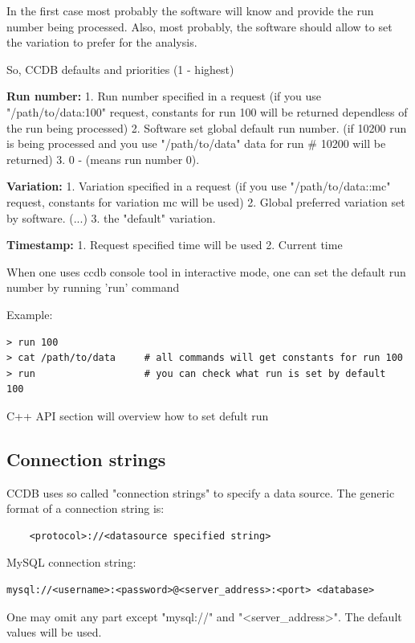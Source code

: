 \documentclass{article}
\begin{document}
In the first case most probably the software will know and provide the run 
number being processed. Also, most probably, the software should allow to set 
the variation to prefer for the analysis.

So, CCDB defaults and priorities (1 - highest)

\textbf{Run number:}
1. Run number specified in a request
(if you use "/path/to/data:100" request, constants for run 100 will be returned 
dependless of the run being processed)
2. Software set global default run number.
(if 10200 run is being processed and you use "/path/to/data" data for run \# 10200 will be returned)
3. 0 - (means run number 0).

\textbf{Variation:}
1. Variation specified in a request
(if you use "/path/to/data::mc" request, constants for variation mc will be used)
2. Global preferred variation set by software.
(...)
3. the "default" variation.


\textbf{Timestamp:}
1. Request specified time will be used
2. Current time

When one uses ccdb console tool in interactive mode, one can set the default run number by running 'run' command

Example:
\begin{verbatim}
> run 100
> cat /path/to/data     # all commands will get constants for run 100
> run                   # you can check what run is set by default
100
\end{verbatim}
C++ API section will overview how to set defult run


\subsection{Connection strings}\label{sec:connection}


CCDB uses so called "connection strings" to specify a data source.
The generic format of a connection string is:
\begin{verbatim}
    <protocol>://<datasource specified string>
\end{verbatim}

MySQL connection string:
\begin{verbatim}
mysql://<username>:<password>@<server_address>:<port> <database>
\end{verbatim}

One may omit any part except "mysql://" and "<server\_address>". The default
values will be used.
\end{document}
